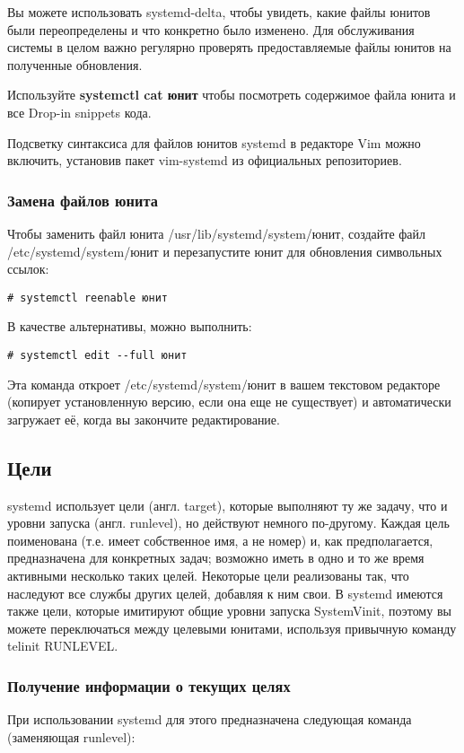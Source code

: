 \documentclass[a4paper,10pt,twoside]{article}
\begin{document}
Вы можете использовать systemd-delta, чтобы увидеть, какие файлы юнитов были переопределены и что конкретно было изменено. Для обслуживания системы в целом важно регулярно проверять предоставляемые файлы юнитов на полученные обновления.

Используйте \textbf{systemctl cat юнит} чтобы посмотреть содержимое файла юнита и все Drop-in snippets кода.

Подсветку синтаксиса для файлов юнитов systemd в редакторе Vim можно включить, установив пакет vim-systemd из официальных репозиториев.

\subsubsection{Замена файлов юнита}
Чтобы заменить файл юнита /usr/lib/systemd/system/юнит, создайте файл /etc/systemd/system/юнит и перезапустите юнит для обновления символьных ссылок:

\begin{verbatim}
# systemctl reenable юнит
\end{verbatim} 
В качестве альтернативы, можно выполнить:

\begin{verbatim}
# systemctl edit --full юнит
\end{verbatim} 
Эта команда откроет /etc/systemd/system/юнит в вашем текстовом редакторе (копирует установленную версию, если она еще не существует) и автоматически загружает её, когда вы закончите редактирование.

\subsection{Цели}
systemd использует цели (англ. target), которые выполняют ту же задачу, что и уровни запуска (англ. runlevel), но действуют немного по-другому. Каждая цель поименована (т.е. имеет собственное имя, а не номер) и, как предполагается, предназначена для конкретных задач; возможно иметь в одно и то же время активными несколько таких целей. Некоторые цели реализованы так, что наследуют все службы других целей, добавляя к ним свои. В systemd имеются также цели, которые имитируют общие уровни запуска SystemVinit, поэтому вы можете переключаться между целевыми юнитами, используя привычную команду telinit RUNLEVEL.

\subsubsection{Получение информации о текущих целях}
При использовании systemd для этого предназначена следующая команда (заменяющая runlevel):
\end{document}
